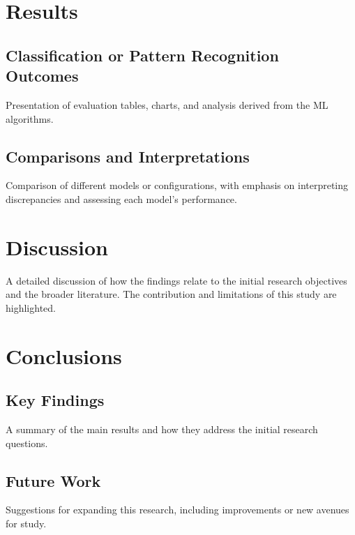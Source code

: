 \documentclass[a4paper,12pt]{report}
\begin{document}
\chapter{Results}

\section{Classification or Pattern Recognition Outcomes}
Presentation of evaluation tables, charts, and analysis derived from the ML algorithms.

\section{Comparisons and Interpretations}
Comparison of different models or configurations, with emphasis on interpreting discrepancies and assessing each model’s performance.

\chapter{Discussion}

A detailed discussion of how the findings relate to the initial research objectives and the broader literature. The contribution and limitations of this study are highlighted.

\chapter{Conclusions}

\section{Key Findings}
A summary of the main results and how they address the initial research questions.

\section{Future Work}
Suggestions for expanding this research, including improvements or new avenues for study.
\end{document}
